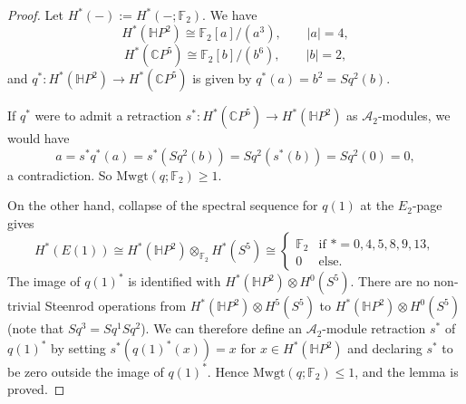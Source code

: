 \documentclass[10pt,a4paper]{amsart}
\newcommand{\C}{\mathbb{C}}
\newcommand{\F}{\mathbb{F}}
\newcommand{\Ha}{\mathbb{H}}
\def\Mwgt{\mathrm{Mwgt}}
\begin{document}
\begin{proof}
Let $H^*(-):=H^*(-;\F_2)$. We have
  \[
 H^*(\Ha P^2)\cong \F_2[a]/(a^3),\qquad |a|=4,
 \]
 \[
 H^*(\C P^5) \cong \F_2[b]/(b^6),\qquad |b|=2,
 \]
 and $q^*:H^*(\Ha P^2)\to H^*(\C P^5)$ is given by $q^*(a)=b^2=Sq^2(b)$.
 
 If $q^*$ were to admit a retraction $s^*:H^*(\C P^5)\to H^*(\Ha P^2)$ as $\mathcal{A}_2$-modules, we would have
 \[
 a=s^* q^*(a)=s^*(Sq^2(b))=Sq^2(s^*(b))=Sq^2(0)=0,
 \]
 a contradiction. So $\Mwgt(q;\F_2)\ge 1$. 
 
 On the other hand, collapse of the spectral sequence for $q(1)$ at the $E_2$-page gives
 \begin{equation}\label{eq:cohE1}
 H^*(E(1)) \cong H^*(\Ha P^2)\otimes_{\F_2} H^*(S^5) \cong \begin{cases} \F_2 & \mbox{if }*=0,4,5,8,9,13, \\ 0 & \mbox{else.} \end{cases}
 \end{equation}
The image of $q(1)^*$ is identified with $H^*(\Ha P^2)\otimes H^0(S^5)$. There are no non-trivial Steenrod operations from $H^*(\Ha P^2)\otimes H^5(S^5)$ to $H^*(\Ha P^2)\otimes H^0(S^5)$ (note that $Sq^3=Sq^1Sq^2$). We can therefore define an $\mathcal{A}_2$-module retraction $s^*$ of $q(1)^*$ by setting $s^*(q(1)^*(x))=x$ for $x\in H^*(\Ha P^2)$ and declaring $s^*$ to be zero outside the image of $q(1)^*$.  Hence $\Mwgt(q;\F_2)\le1$, and the lemma is proved.
 \end{proof}
\end{document}
